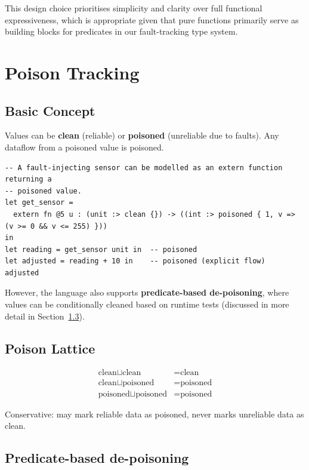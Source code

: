 \documentclass[12pt]{article}
\begin{document}
This design choice prioritises simplicity and clarity over full functional
expressiveness, which is appropriate given that pure functions primarily serve
as building blocks for predicates in our fault-tracking type system.

\section{Poison Tracking}

\subsection{Basic Concept}

Values can be \textbf{clean} (reliable) or \textbf{poisoned} (unreliable due to
faults). Any dataflow from a poisoned value is poisoned. 

\begin{lstlisting}[language=poison]
-- A fault-injecting sensor can be modelled as an extern function returning a
-- poisoned value.
let get_sensor =
  extern fn @5 u : (unit :> clean {}) -> ((int :> poisoned { 1, v => (v >= 0 && v <= 255) }))
in
let reading = get_sensor unit in  -- poisoned
let adjusted = reading + 10 in    -- poisoned (explicit flow)
adjusted
\end{lstlisting}

However, the language also supports \textbf{predicate-based de-poisoning}, where
values can be conditionally cleaned based on runtime tests (discussed in more
detail in Section~\ref{sec:de-poisoning}).

\subsection{Poison Lattice}

\begin{align*}
\text{clean} \sqcup \text{clean} &= \text{clean} \\
\text{clean} \sqcup \text{poisoned} &= \text{poisoned} \\
\text{poisoned} \sqcup \text{poisoned} &= \text{poisoned}
\end{align*}

Conservative: may mark reliable data as poisoned, never marks unreliable data as clean.

\subsection{Predicate-based de-poisoning}
\label{sec:de-poisoning}
\end{document}

